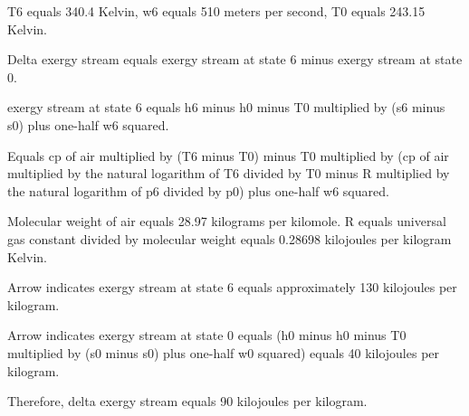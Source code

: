 T6 equals 340.4 Kelvin, w6 equals 510 meters per second, T0 equals 243.15 Kelvin.  

Delta exergy stream equals exergy stream at state 6 minus exergy stream at state 0.  

exergy stream at state 6 equals h6 minus h0 minus T0 multiplied by (s6 minus s0) plus one-half w6 squared.  

Equals cp of air multiplied by (T6 minus T0) minus T0 multiplied by (cp of air multiplied by the natural logarithm of T6 divided by T0 minus R multiplied by the natural logarithm of p6 divided by p0) plus one-half w6 squared.  

Molecular weight of air equals 28.97 kilograms per kilomole. R equals universal gas constant divided by molecular weight equals 0.28698 kilojoules per kilogram Kelvin.  

Arrow indicates exergy stream at state 6 equals approximately 130 kilojoules per kilogram.  

Arrow indicates exergy stream at state 0 equals (h0 minus h0 minus T0 multiplied by (s0 minus s0) plus one-half w0 squared) equals 40 kilojoules per kilogram.  

Therefore, delta exergy stream equals 90 kilojoules per kilogram.